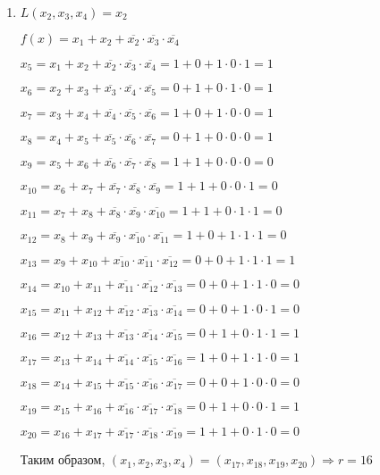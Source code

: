 \documentclass[12pt]{extarticle}
\begin{document}
\begin{enumerate}
    \item $L(x_2,x_3,x_4) = x_2$
    
    $f(x) = x_1 + x_2 + \overline{x_2}\cdot \overline{x_3}\cdot \overline{x_4}$
    
    $x_5 = x_1 + x_2 + \overline{x_2}\cdot \overline{x_3}\cdot \overline{x_4} = 1 + 0 + 1\cdot0\cdot1=1$
    
    $x_6 = x_2 + x_3 +  \overline{x_3}\cdot \overline{x_4}\cdot \overline{x_5} = 0 + 1 + 0\cdot1\cdot0 = 1$
    
    $x_7 = x_3 + x_4 +  \overline{x_4}\cdot \overline{x_5}\cdot \overline{x_6} = 1 + 0 + 1\cdot0\cdot0 = 1$
    
    $x_8 = x_4 + x_5 +  \overline{x_5}\cdot \overline{x_6}\cdot \overline{x_7} = 0 + 1 + 0\cdot0\cdot0 = 1$
    
    $x_9 = x_5 + x_6 +  \overline{x_6}\cdot \overline{x_7}\cdot \overline{x_8} = 1 + 1 + 0\cdot0\cdot0 = 0$
    
    $x_{10} = x_6 + x_7 +  \overline{x_7}\cdot \overline{x_8}\cdot \overline{x_9} = 1 + 1 + 0\cdot0\cdot1 = 0$
    
    $x_{11} = x_7 + x_8 +  \overline{x_8}\cdot \overline{x_9}\cdot \overline{x_{10}} = 1 + 1 + 0\cdot1\cdot1 = 0$
    
    $x_{12} = x_8 + x_9 +  \overline{x_9}\cdot \overline{x_{10}}\cdot \overline{x_{11}} = 1 + 0 + 1\cdot1\cdot1 = 0$
    
    $x_{13} = x_9 + x_{10} +  \overline{x_{10}}\cdot \overline{x_{11}}\cdot \overline{x_{12}} = 0 + 0 + 1\cdot1\cdot1 = 1$
    
    $x_{14} = x_{10} + x_{11} +  \overline{x_{11}}\cdot \overline{x_{12}}\cdot \overline{x_{13}} = 0 + 0 + 1\cdot1\cdot0 = 0$
    
    $x_{15} = x_{11} + x_{12} +  \overline{x_{12}}\cdot \overline{x_{13}}\cdot \overline{x_{14}} = 0 + 0 + 1\cdot0\cdot1 = 0$
    
    $x_{16} = x_{12} + x_{13} +  \overline{x_{13}}\cdot \overline{x_{14}}\cdot \overline{x_{15}} = 0 + 1 + 0\cdot1\cdot1 = 1$
    
    $x_{17} = x_{13} + x_{14} +  \overline{x_{14}}\cdot \overline{x_{15}}\cdot \overline{x_{16}} = 1 + 0 + 1\cdot1\cdot0 = 1$
    
    $x_{18} = x_{14} + x_{15} +  \overline{x_{15}}\cdot \overline{x_{16}}\cdot \overline{x_{17}} = 0 + 0 + 1\cdot0\cdot0 = 0$
    
    $x_{19} = x_{15} + x_{16} +  \overline{x_{16}}\cdot \overline{x_{17}}\cdot \overline{x_{18}} = 0 + 1 + 0\cdot0\cdot1 = 1$
    
    $x_{20} = x_{16} + x_{17} +  \overline{x_{17}}\cdot \overline{x_{18}}\cdot \overline{x_{19}} = 1 + 1 + 0\cdot1\cdot0 = 0$
    
    Таким образом, $(x_1, x_2, x_3, x_4) = (x_{17}, x_{18}, x_{19}, x_{20}) \Rightarrow r = 16$
    
\end{enumerate}
\end{document}
